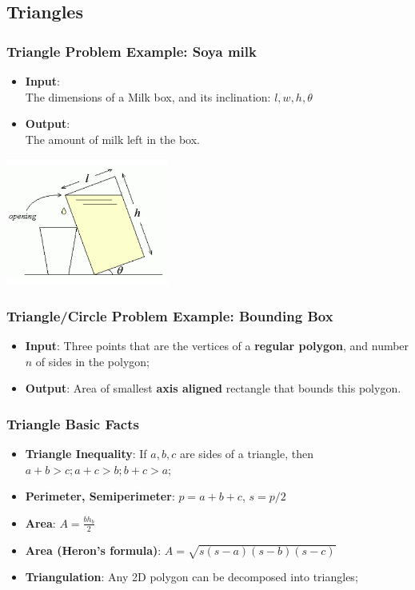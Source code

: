 \subsection{Triangles}

\begin{frame}
  \frametitle{Triangle Problem Example: Soya milk}
  \begin{block}{}
    \begin{itemize}
    \item {\bf Input}:\\
      The dimensions of a Milk box, and its inclination: $l, w, h, \theta$
    \item {\bf Output}:\\
      The amount of milk left in the box.
    \end{itemize}
  \end{block}

  \includegraphics[width=0.4\textwidth]{img/milk_uva}
\end{frame}

\begin{frame}[t]
  \frametitle{Triangle/Circle Problem Example: Bounding Box}
  \begin{block}{}
    \begin{itemize}
      \item {\bf Input}: Three points that are the vertices of a {\bf regular polygon}, and number $n$ of sides in the polygon;\medskip
      \item {\bf Output}: Area of smallest {\bf axis aligned} rectangle that bounds this polygon.\medskip
    \end{itemize}
  \end{block}
\end{frame}

\begin{frame}
  \frametitle{Triangle Basic Facts}

    \begin{itemize}
    \item {\bf Triangle Inequality}: If $a,b,c$ are sides of a triangle, then $a+b > c; a+c > b; b+c > a$;\bigskip
    \item {\bf Perimeter, Semiperimeter}: $p = a+b+c$, $s = p/2$\bigskip
    \item {\bf Area}: $A = \frac{bh_b}{2}$\bigskip
    \item {\bf Area (Heron's formula)}: $A = \sqrt{s(s-a)(s-b)(s-c)}$\bigskip
    \item {\bf Triangulation}: Any 2D polygon can be decomposed into triangles;
  \end{itemize}
\end{frame}

